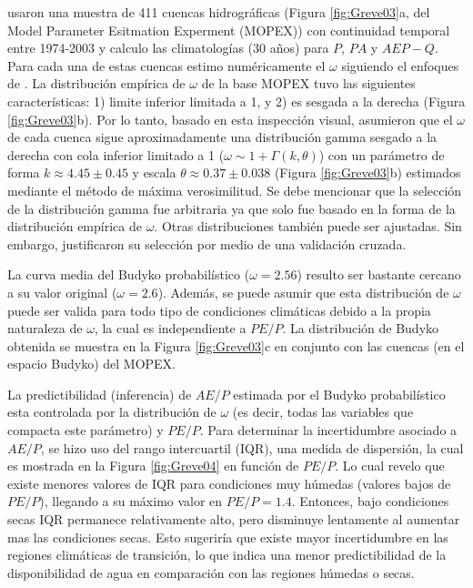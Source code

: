 \documentclass[12pt]{article}
\begin{document}
\citet{Greve2015} usaron una muestra de 411 cuencas hidrográficas (Figura \ref{fig:Greve03}a, del Model Parameter Esitmation Experment (MOPEX)) con continuidad temporal entre 1974-2003 y calculo las climatologías (30 años) para $P$, $PA$ y $AE P - Q$. Para cada una de estas cuencas estimo numéricamente el $\omega$ siguiendo el enfoques de \citet{Zhang2004}. La distribución empírica de $\omega$ de la base MOPEX tuvo las siguientes características: 1) limite inferior limitada a 1, y 2) es sesgada a la derecha (Figura \ref{fig:Greve03}b). Por lo tanto, basado en esta inspección visual, \citet{Greve2015} asumieron que el $\omega$ de cada cuenca sigue aproximadamente una distribución gamma sesgado a la derecha con cola inferior limitado a 1 ($\omega \sim 1 + \Gamma (k, \theta )$) con un parámetro de forma $k \approx 4.45 \pm 0.45$ y escala $\theta \approx 0.37 \pm 0.038$ (Figura \ref{fig:Greve03}b) estimados mediante el método de máxima verosimilitud. Se debe mencionar que la selección de la distribución gamma fue arbitraria ya que solo fue basado en la forma de la distribución empírica de $\omega$. Otras distribuciones también puede ser ajustadas. Sin embargo, \citet{Greve2015} justificaron su selección por medio de una validación cruzada.

\clearpage

\clearpage

La curva media del Budyko probabilístico ($\omega = 2.56$) resulto ser bastante cercano a su valor original ($\omega = 2.6$). Además, se puede asumir que esta distribución de $\omega$ puede ser valida para todo tipo de condiciones climáticas debido a la propia naturaleza de $\omega$, la cual es independiente a $PE/P$. La distribución de Budyko obtenida se muestra en la Figura \ref{fig:Greve03}c en conjunto con las cuencas (en el espacio Budyko) del MOPEX.



La predictibilidad (inferencia) de $AE/P$ estimada por el Budyko probabilístico esta controlada por la distribución de $\omega$ (es decir, todas las variables que compacta este parámetro) y $PE/P$. Para determinar la incertidumbre asociado a $AE/P$, se hizo uso del rango intercuartil (IQR), una medida de dispersión, la cual es mostrada en la Figura \ref{fig:Greve04} en función de $PE/P$. Lo cual revelo que existe menores valores de IQR para condiciones muy húmedas (valores bajos de $PE/P$), llegando a su máximo valor en $PE/P = 1.4$. Entonces, bajo condiciones secas IQR permanece relativamente alto, pero disminuye lentamente al aumentar mas las condiciones secas. Esto sugeriría que existe mayor incertidumbre en las regiones climáticas de transición, lo que indica una menor predictibilidad de la disponibilidad de agua en comparación con las regiones húmedas o secas.
\end{document}
